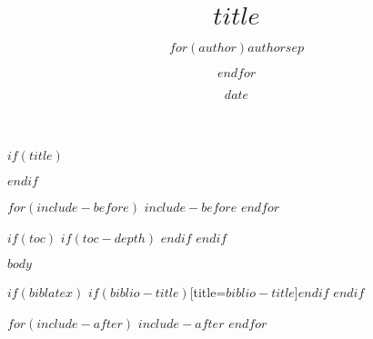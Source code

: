 \documentclass[pagesize,english,DIV=calc,footinclude=false
$if(classoptions)$
    ,$classoptions$
$endif$
]{scrartcl}
\title{$title$}
\author{$for(author)$$author$$sep$ \and $endfor$}
\date{$date$}
\begin{document}
$if(title)$
\maketitle
$endif$

$for(include-before)$
$include-before$
$endfor$

$if(toc)$
{
\hypersetup{linkcolor=black}
$if(toc-depth)$
\setcounter{tocdepth}{$toc-depth$}
$endif$
\tableofcontents
}
$endif$

$body$

$if(biblatex)$
\printbibliography$if(biblio-title)$[title=$biblio-title$]$endif$
$endif$

$for(include-after)$
$include-after$
$endfor$
\end{document}
